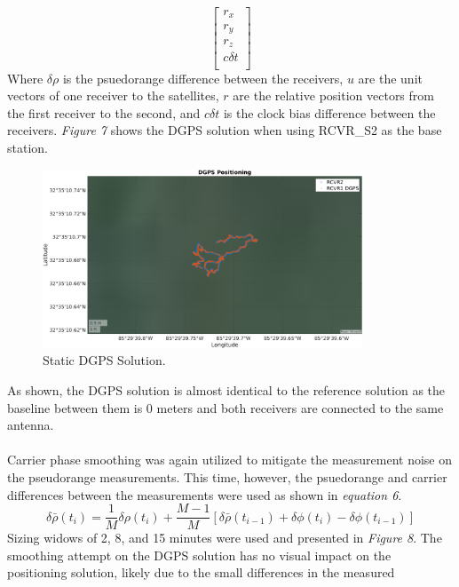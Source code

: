 \documentclass[11pt]{article}
\begin{document}
\begin{enumerate}[label=\textbf{\arabic*.}]
\begin{equation}
\begin{bmatrix}
        r_x \\ r_y \\ r_z \\ c \delta t \\
      \end{bmatrix}
    \end{equation}
    Where $\delta\rho$ is the psuedorange difference between the receivers, $u$ are 
    the unit vectors of one receiver to the satellites, $r$ are the relative position 
    vectors from the first receiver to the second, and $c \delta t$ is the clock bias 
    difference between the receivers. \emph{Figure 7} shows the DGPS solution when using 
    RCVR\_S2 as the base station.
    \begin{figure}[H]
      \centering
      \includegraphics[width=0.85\textwidth]{p2_b.png}
      \caption{Static DGPS Solution.}
    \end{figure}
    As shown, the DGPS solution is almost identical to the reference solution as the 
    baseline between them is 0 meters and both receivers are connected to the same 
    antenna.
    \\ \\
    Carrier phase smoothing was again utilized to mitigate the measurement 
    noise on the pseudorange measurements. This time, however, the psuedorange and 
    carrier differences between the measurements were used as shown in 
    \emph{equation 6}.
    \begin{equation}
      \delta\bar{\rho}(t_i) = \dfrac{1}{M} \delta\rho(t_i) + 
                              \dfrac{M-1}{M} \left[\delta\bar{\rho}(t_{i-1}) + 
                              \delta\phi(t_i) - \delta\phi(t_{i-1})\right]
    \end{equation}
    Sizing widows of 2, 8, and 15 minutes were used and presented in \emph{Figure 8}. 
    The smoothing attempt on the DGPS solution has no visual impact on the 
    positioning solution, likely due to the small differences in the measured 

\end{enumerate}
\end{document}
